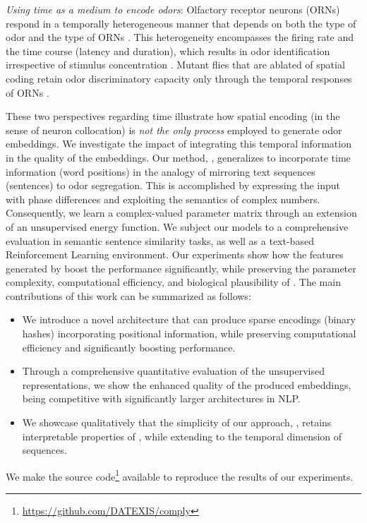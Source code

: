 \par
\textit{Using time as a medium to encode odors}:
Olfactory receptor neurons (ORNs) respond in a temporally heterogeneous manner that depends on both the type of odor and the type of ORNs \cite{raman2010temporally}.
This heterogeneity encompasses the firing rate and the time course (latency and duration), which results in odor identification irrespective of stimulus concentration \cite{stopfer2003intensity}.
Mutant flies that are ablated of spatial coding retain odor discriminatory capacity only through the temporal responses of ORNs \cite{dasgupta2008learned, olsen2007excitatory}.

\par
These two perspectives regarding time illustrate how spatial encoding (in the sense of neuron collocation) is \textit{not the only process} employed to generate odor embeddings.
We investigate the impact of integrating this temporal information in the quality of the embeddings.
Our method, \methodname, generalizes \flyvec to incorporate time information (word positions) in the analogy of mirroring text sequences (sentences) to odor segregation.
This is accomplished by expressing the input with phase differences and exploiting the semantics of complex numbers. 
Consequently, we learn a complex-valued parameter matrix through an extension of an unsupervised energy function.
We subject our models to a comprehensive evaluation in semantic sentence similarity tasks, as well as a text-based Reinforcement Learning environment.
Our experiments show how the features generated by \methodname boost the performance significantly, while preserving the parameter complexity, computational efficiency, and biological plausibility of \flyvec.
The main contributions of this work can be summarized as follows:
\begin{itemize}
    \item We introduce a novel architecture that can produce sparse encodings (binary hashes) incorporating positional information, while preserving computational efficiency and significantly boosting performance.
    \item Through a comprehensive quantitative evaluation of the unsupervised representations, we show the enhanced quality of the produced embeddings, being competitive with significantly larger architectures in NLP.
    \item We showcase qualitatively that the simplicity of our approach, \methodname, retains interpretable properties of \flyvec, while extending to the temporal dimension of sequences.
\end{itemize}
We make the source code\footnote{\href{https://github.com/DATEXIS/comply}{https://github.com/DATEXIS/comply}} available to reproduce the results of our experiments.